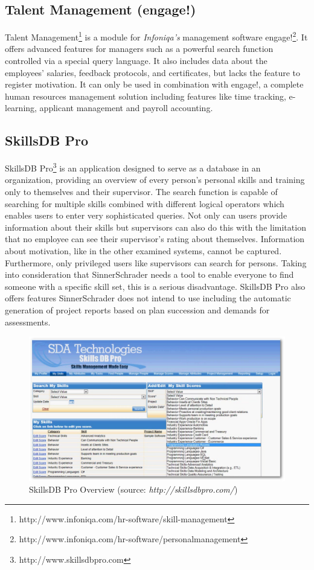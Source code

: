 \subsection{Talent Management (engage!)}
Talent Management\footnote{http://www.infoniqa.com/hr-software/skill-management} is a module for \textit{Infoniqa’s} management software engage!\footnote{http://www.infoniqa.com/hr-software/personalmanagement}. It offers advanced features for managers such as a powerful search function controlled via a special query language. It also includes data about the employees’ salaries, feedback protocols, and certificates, but lacks the feature to register motivation. It can only be used in combination with engage!, a complete human resources management solution including features like time tracking, e-learning, applicant management and payroll accounting.

\subsection{SkillsDB Pro}
SkillsDB Pro\footnote{http://www.skillsdbpro.com} is an application designed to serve as a database in an organization, providing an overview of every person’s personal skills and training only to themselves and their supervisor. The search function is capable of searching for multiple skills combined with different logical operators which enables users to enter very sophisticated queries.
Not only can users provide information about their skills but supervisors can also do this with the limitation that no employee can see their supervisor's rating about themselves. Information about motivation, like in the other examined systems, cannot be captured.
Furthermore, only privileged users like supervisors can search for persons. Taking into consideration that SinnerSchrader needs a tool to enable everyone to find someone with a specific skill set, this is a serious disadvantage.
SkillsDB Pro also offers features SinnerSchrader does not intend to use including the automatic generation of project reports based on plan succession and demands for assessments.

\begin{figure}[!htp]
    \centering
    \includegraphics[width=\textwidth]{images/skillsdbpro.png}
    \caption[Screenshot: SkillsDB Pro Overview]{SkillsDB Pro Overview (source: \textit{http://skillsdbpro.com/})}
    \label{fig:talent_management}
\end{figure}

